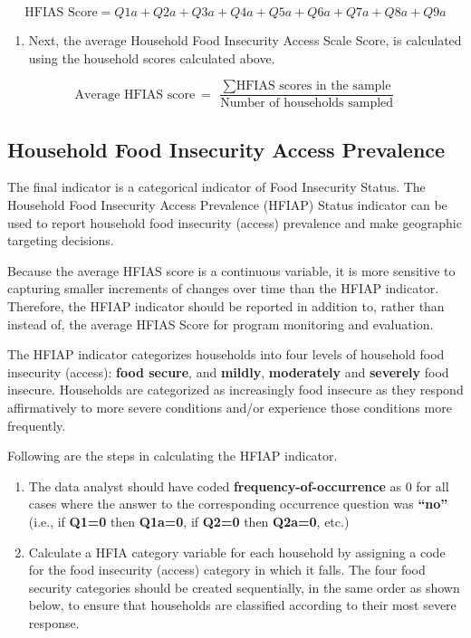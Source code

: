 \documentclass[12pt,]{book}
\providecommand{\tightlist}{%
  \setlength{\itemsep}{0pt}\setlength{\parskip}{0pt}}
\theoremstyle{definition}
\theoremstyle{definition}
\theoremstyle{definition}
\theoremstyle{remark}
\begin{document}
\[ \text{HFIAS Score} = Q1a + Q2a + Q3a + Q4a + Q5a + Q6a + Q7a + Q8a + Q9a \]

\begin{enumerate}
\def\labelenumi{\arabic{enumi}.}
\setcounter{enumi}{2}
\tightlist
\item
  Next, the average Household Food Insecurity Access Scale Score, is
  calculated using the household scores calculated above.
\end{enumerate}

\[ \text{Average HFIAS score} ~ = ~ \frac{\sum{\text{HFIAS scores in the sample}}}{\text{Number of households sampled}} \]

\hypertarget{household-food-insecurity-access-prevalence}{%
\subsection{Household Food Insecurity Access
Prevalence}\label{household-food-insecurity-access-prevalence}}

The final indicator is a categorical indicator of Food Insecurity
Status. The Household Food Insecurity Access Prevalence (HFIAP) Status
indicator can be used to report household food insecurity (access)
prevalence and make geographic targeting decisions.

Because the average HFIAS score is a continuous variable, it is more
sensitive to capturing smaller increments of changes over time than the
HFIAP indicator. Therefore, the HFIAP indicator should be reported in
addition to, rather than instead of, the average HFIAS Score for program
monitoring and evaluation.

The HFIAP indicator categorizes households into four levels of household
food insecurity (access): \textbf{food secure}, and \textbf{mildly},
\textbf{moderately} and \textbf{severely} food insecure. Households are
categorized as increasingly food insecure as they respond affirmatively
to more severe conditions and/or experience those conditions more
frequently.

Following are the steps in calculating the HFIAP indicator.

\begin{enumerate}
\def\labelenumi{\arabic{enumi}.}
\item
  The data analyst should have coded \textbf{frequency-of-occurrence} as
  0 for all cases where the answer to the corresponding occurrence
  question was \textbf{``no''} (i.e., if \textbf{Q1=0} then
  \textbf{Q1a=0}, if \textbf{Q2=0} then \textbf{Q2a=0}, etc.)
\item
  Calculate a HFIA category variable for each household by assigning a
  code for the food insecurity (access) category in which it falls. The
  four food security categories should be created sequentially, in the
  same order as shown below, to ensure that households are classified
  according to their most severe response.
\end{enumerate}
\end{document}
